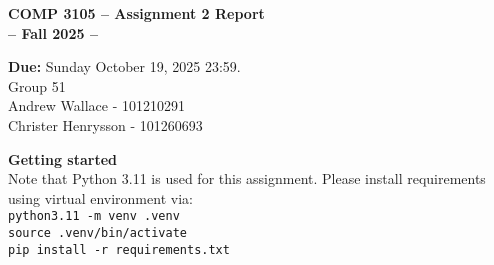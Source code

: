 \documentclass[12pt]{article}
\begin{document}
 

\begin{center} \Large\bf
COMP 3105 -- Assignment 2 Report\\
-- Fall 2025 -- 
\end{center} 

\begin{center}
{\bf Due:} Sunday October 19, 2025 23:59. \\
Group 51 \\
Andrew Wallace - 101210291\\
Christer Henrysson - 101260693\\[1em]
\end{center}
\textbf{Getting started} \\
Note that Python 3.11 is used for this assignment. Please install requirements using virtual environment via: \\
  \texttt{python3.11 -m venv .venv} \\
  \texttt{source .venv/bin/activate} \\
  \texttt{pip install -r requirements.txt}
\vspace{0.5em}
\newpage 
\end{document}
